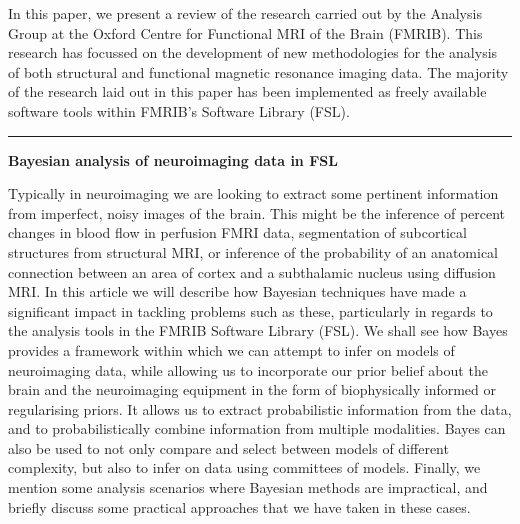\documentclass[12pt]{article}
\begin{document}
In this paper, we present a review of the research carried out by the Analysis Group at the Oxford Centre 
for Functional MRI of the Brain (FMRIB). This research has focussed on the development of new methodologies 
for the analysis of both structural and functional magnetic resonance imaging data. The majority of the 
research laid out in this paper has been implemented as freely available software tools within FMRIB’s 
Software Library (FSL).

\par\rule{\textwidth}{0.5pt}


\textbf{Bayesian analysis of neuroimaging data in FSL}   

\hfill

Typically in neuroimaging we are looking to extract some pertinent information from imperfect, noisy images 
of the brain. This might be the inference of percent changes in blood flow in perfusion FMRI data, 
segmentation of subcortical structures from structural MRI, or inference of the probability of an 
anatomical connection between an area of cortex and a subthalamic nucleus using diffusion MRI. In this 
article we will describe how Bayesian techniques have made a significant impact in tackling problems such 
as these, particularly in regards to the analysis tools in the FMRIB Software Library (FSL). We shall see 
how Bayes provides a framework within which we can attempt to infer on models of neuroimaging data, while 
allowing us to incorporate our prior belief about the brain and the neuroimaging equipment in the form of 
biophysically informed or regularising priors. It allows us to extract probabilistic information from the 
data, and to probabilistically combine information from multiple modalities. Bayes can also be used to not 
only compare and select between models of different complexity, but also to infer on data using committees 
of models. Finally, we mention some analysis scenarios where Bayesian methods are impractical, and briefly 
discuss some practical approaches that we have taken in these cases.
\end{document}
